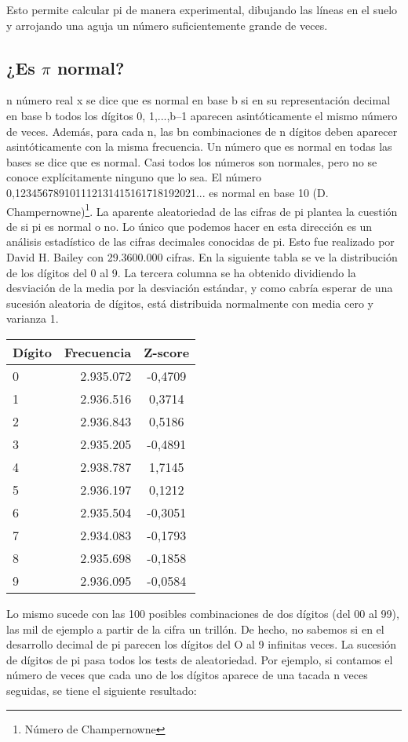 \documentclass[spanish,a4paper,10pt]{article}
\begin{document}
Esto permite calcular pi de manera experimental, dibujando las líneas en el suelo y arrojando una aguja un número suficientemente grande de veces.

\subsection{¿Es $\pi$ normal?}
n número real x se dice que es normal en base b si en su representación decimal en base b todos los dígitos 0, 1,...,b–1 aparecen asintóticamente el mismo número de veces. Además, para cada n, las bn combinaciones de n dígitos deben aparecer asintóticamente con la misma frecuencia. Un número que es normal en todas las bases se dice que es normal. Casi todos los números son normales, pero no se conoce explícitamente ninguno que lo sea. El número 0,123456789101112131415161718192021... es normal en base 10 (D. Champernowne)\footnote{Número de Champernowne}.
La aparente aleatoriedad de las cifras de pi plantea la cuestión de si pi es normal o no. Lo único que podemos hacer en esta dirección es un análisis estadístico de las cifras decimales conocidas de pi. Esto fue realizado por David H. Bailey con 29.3600.000 cifras. En la siguiente tabla se ve la distribución de los dígitos del 0 al 9. La tercera columna se ha obtenido dividiendo la desviación de la media por la desviación estándar, y como cabría esperar de una sucesión aleatoria de dígitos, está distribuida normalmente con media cero y varianza 1.

\begin{tabular}{lrc}
Dígito & Frecuencia & Z-score\\
\hline
0 & 2.935.072 & -0,4709\\
1 & 2.936.516 & 0,3714\\
2 & 2.936.843 & 0,5186\\
3 & 2.935.205 & -0,4891\\
4 & 2.938.787 & 1,7145\\
5 & 2.936.197 & 0,1212\\
6 & 2.935.504 & -0,3051\\
7 & 2.934.083 & -0,1793\\
8 & 2.935.698 & -0,1858\\
9 & 2.936.095 & -0,0584\\
\end{tabular}

Lo mismo sucede con las 100 posibles combinaciones de dos dígitos (del 00 al 99), las mil de ejemplo a partir de la cifra un trillón. De hecho, no sabemos si en el desarrollo decimal de pi  parecen los dígitos del O al 9 infinitas veces. La sucesión de dígitos de pi pasa todos los tests de aleatoriedad. Por ejemplo, si contamos el número de veces que cada uno de los dígitos aparece de una tacada n veces seguidas, se tiene el siguiente resultado:
\end{document}
